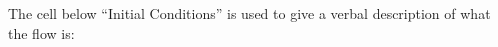 \begin{center}
\par\end{center}

The cell below ``Initial Conditions'' is used to give a verbal description
of what the flow is:


\begin{center}
\par\end{center}

